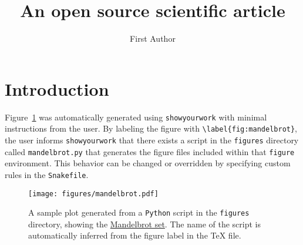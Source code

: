 \documentclass[twocolumn]{aastex631}
\begin{document}
\title{An open source scientific article}

\author{First Author}

\begin{abstract}
    \blindtext
\end{abstract}

\section{Introduction}

Figure~\ref{fig:mandelbrot} was automatically generated using \texttt{showyourwork} with minimal instructions from the user.
By labeling the figure with \verb+\label{fig:mandelbrot}+, the user informs \texttt{showyourwork} that there exists a script in the \texttt{figures} directory called \texttt{mandelbrot.py} that generates the figure files included within that \texttt{figure} environment.
This behavior can be changed or overridden by specifying custom rules in the \texttt{Snakefile}.

\begin{figure}[ht!]
    \begin{centering}
        \texttt{[image: figures/mandelbrot.pdf]}
        \caption{
            A sample plot generated from a \texttt{Python} script in the \texttt{figures} directory, showing the \href{https://en.wikipedia.org/wiki/Mandelbrot_set}{Mandelbrot set}.
            The name of the script is automatically inferred from the figure label in the TeX file.
        }
        \label{fig:mandelbrot}
    \end{centering}
\end{figure}
\end{document}
